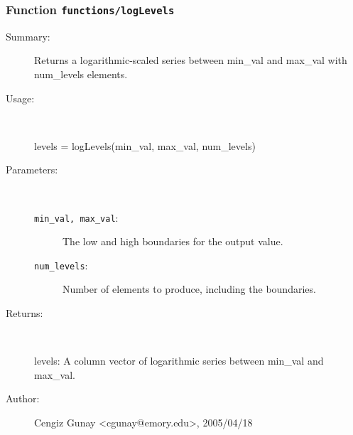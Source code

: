 \subsubsection[Function \texttt{logLevels}]{Function \texttt{functions/logLevels}}%
%
\label{ref_functions__logLevels}%
\hypertarget{ref_functions__logLevels}{}%
\begin{description}
\item[Summary:]Returns a logarithmic-scaled series between min\_val and max\_val with num\_levels elements.
%
\item[Usage:]~%
\begin{lyxcode}%
levels = logLevels(min\_val, max\_val, num\_levels)
%
\end{lyxcode}%
%
%
\item[Parameters:]~
\begin{description}%
\item[\texttt{min\_val, max\_val}:]
 The low and high boundaries for the output value.
\item[\texttt{num\_levels}:]
 Number of elements to produce, including the boundaries.
\end{description}%
%
\item[Returns:
]~

 	levels: A column vector of logarithmic series between min\_val and max\_val.
%
%
%
\item[Author:]%
Cengiz Gunay <cgunay@emory.edu>, 2005/04/18
%
\end{description}
\methodline%
